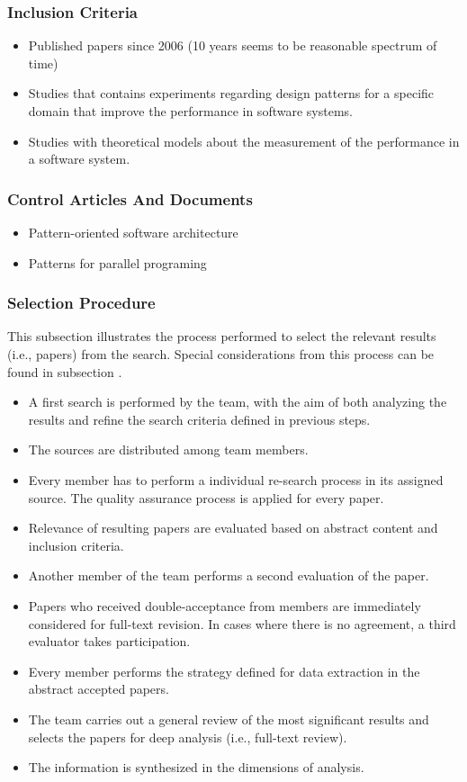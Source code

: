 \subsubsection {Inclusion Criteria}
\begin{itemize}
	\item Published papers since 2006 (10 years seems to be reasonable spectrum of time)
	\item Studies that contains experiments regarding design patterns for a specific domain that improve the performance in software systems.
	\item Studies with theoretical models about the measurement of the performance in a software system.
\end{itemize}
\subsubsection {Control Articles And Documents}
\begin{itemize}
	\item Pattern-oriented software architecture \cite{Buschmann:1996:PSA}
	\item Patterns for parallel programing \cite{Mattson:2004:PPP}
\end{itemize}
\subsubsection {Selection Procedure}
This subsection illustrates the process performed to select the relevant results (i.e., papers) from the search. Special considerations from this process can be found in subsection \textbf{\emph{}}.

\begin{itemize}
	\item A first search is performed by the team, with the aim of both analyzing the results and refine the search criteria defined in previous steps.
	\item The sources are distributed among team members.
	\item Every member has to perform a individual re-search process in its assigned source. The quality assurance process is applied for every paper.
	\item Relevance of resulting papers are evaluated based on abstract content and inclusion criteria.
	\item Another member of the team performs a second evaluation of the paper.
	\item Papers who received double-acceptance from members are immediately considered for full-text revision. In cases where there is no agreement, a third evaluator takes participation. 
	\item Every member performs the strategy defined for data extraction in the abstract accepted papers.
	\item The team carries out a general review of the most significant results and selects the papers for deep analysis (i.e., full-text review).
	\item The information is synthesized in the dimensions of analysis. 
\end{itemize}
